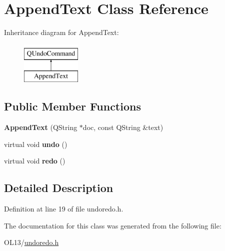 \hypertarget{class_append_text}{}\section{Append\+Text Class Reference}
\label{class_append_text}
Inheritance diagram for Append\+Text\+:\begin{figure}[H]
\begin{center}
\leavevmode
\includegraphics[height=2.000000cm]{class_append_text}
\end{center}
\end{figure}
\subsection*{Public Member Functions}
\begin{DoxyCompactItemize}
\item 
\mbox{\label{class_append_text_a1f053473808df00e83d26566b5be19cd}} 
{\bfseries Append\+Text} (Q\+String $\ast$doc, const Q\+String \&text)
\item 
\mbox{\label{class_append_text_a9289ddb9645f35cc98e05e77d96ca093}} 
virtual void {\bfseries undo} ()
\item 
\mbox{\label{class_append_text_a552142d5909b416eadbb4f6f728cb9d6}} 
virtual void {\bfseries redo} ()
\end{DoxyCompactItemize}


\subsection{Detailed Description}


Definition at line 19 of file undoredo.\+h.



The documentation for this class was generated from the following file\+:\begin{DoxyCompactItemize}
\item 
O\+L13/\hyperlink{undoredo_8h}{undoredo.\+h}\end{DoxyCompactItemize}
